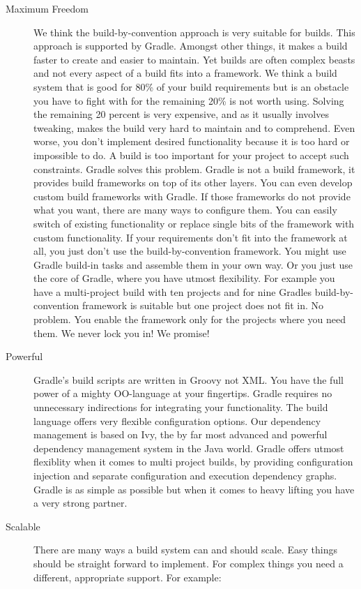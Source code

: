 \begin{description}
\item[Maximum Freedom] We think the build-by-convention approach is very suitable for builds. This approach is supported by Gradle. Amongst other things, it makes a build faster to create and easier to maintain. Yet builds are often complex beasts and not every aspect of a build fits into a framework. We think  a build system that is good for 80\% of your build requirements but is an obstacle you have to fight with for the remaining 20\% is not worth using. Solving the remaining 20 percent is very expensive, and as it usually involves tweaking, makes the build very hard to maintain and to comprehend. Even worse, you don't implement desired functionality because it is too hard or impossible to do. A build is too important for your project to accept such constraints.
Gradle solves this problem. Gradle is not a build framework, it provides build frameworks on top of its other layers. You can even develop custom build frameworks with Gradle. If those frameworks do not provide what you want, there are many ways to configure them. You can easily switch of existing functionality or replace single bits of the framework with custom functionality. If your requirements don't fit into the framework at all, you just don't use the build-by-convention framework. You might use Gradle build-in tasks and assemble them in your own way. Or you just use the core of Gradle, where you have utmost flexibility. For example you have a multi-project build with ten projects and for nine Gradles build-by-convention framework is suitable but one project does not fit in. No problem. You enable the framework only for the projects where you need them. We never lock you in! We promise!
\item[Powerful] Gradle's build scripts are written in Groovy not XML. You have the full power of a mighty OO-language at your fingertips. Gradle requires no unnecessary indirections for integrating your functionality. The build language offers very flexible configuration options. Our dependency management is based on Ivy, the by far most advanced and powerful dependency management system in the Java world. Gradle offers utmost flexiblity when it comes to multi project builds, by providing configuration injection and separate configuration and execution dependency graphs. Gradle is as simple as possible but when it comes to heavy lifting you have a very strong partner.
\item[Scalable] There are many ways a build system can and should scale. Easy things should be straight forward to implement. For complex things you need a different, appropriate support. For example:


\end{description}
